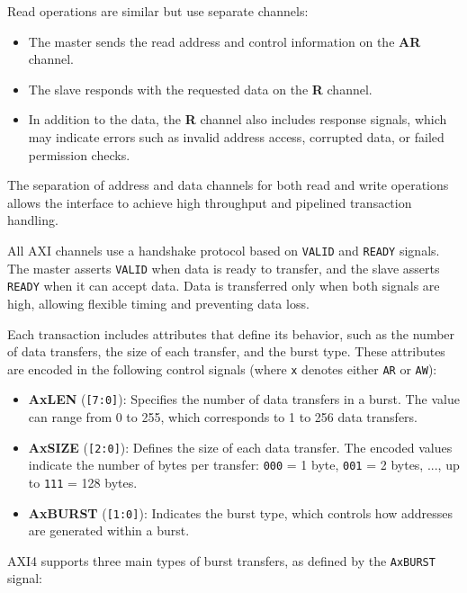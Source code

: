 Read operations are similar but use separate channels:

\begin{itemize}
    \item The master sends the read address and control information on the \textbf{AR} channel.
    \item The slave responds with the requested data on the \textbf{R} channel.
    \item In addition to the data, the \textbf{R} channel also includes response signals, which may indicate errors such as invalid address access, corrupted data, or failed permission checks.
\end{itemize}

The separation of address and data channels for both read and write operations allows the interface to achieve high throughput and pipelined transaction handling.

All AXI channels use a handshake protocol based on \texttt{VALID} and \texttt{READY} signals. The master asserts \texttt{VALID} when data is ready to transfer, and the slave asserts \texttt{READY} when it can accept data. Data is transferred only when both signals are high, allowing flexible timing and preventing data loss.


Each transaction includes attributes that define its behavior, such as the number of data transfers, the size of each transfer, and the burst type. These attributes are encoded in the following control signals (where \texttt{x} denotes either \texttt{AR} or \texttt{AW}):

\begin{itemize}
    \item \textbf{AxLEN} (\texttt{[7:0]}): Specifies the number of data transfers in a burst. The value can range from 0 to 255, which corresponds to 1 to 256 data transfers.
    \item \textbf{AxSIZE} (\texttt{[2:0]}): Defines the size of each data transfer. The encoded values indicate the number of bytes per transfer: \texttt{000} = 1 byte, \texttt{001} = 2 bytes, ..., up to \texttt{111} = 128 bytes.
    \item \textbf{AxBURST} (\texttt{[1:0]}): Indicates the burst type, which controls how addresses are generated within a burst.
\end{itemize}

AXI4 supports three main types of burst transfers, as defined by the \texttt{AxBURST} signal:

